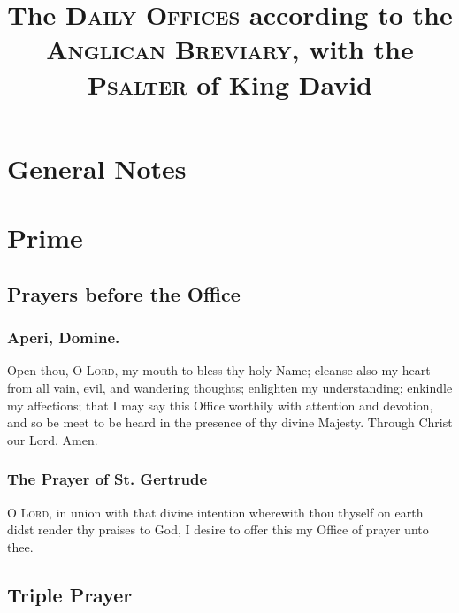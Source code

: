 \documentclass{article}
\title{The \textsc{Daily Offices} according to the \textsc{Anglican Breviary}, with the \textsc{Psalter} of King David}
\date{}
\author{}
\begin{document}
\maketitle
\newpage

\tableofcontents

\newpage

\section{General Notes}


\newpage

\section{Prime}

\subsection*{Prayers before the Office}


\subsubsection*{Aperi, Domine.}

Open thou, O \textsc{Lord}, my mouth to bless thy holy Name; cleanse also my heart from all vain, evil, and wandering thoughts; enlighten my understanding; enkindle my affections; that I may say this Office worthily with attention and devotion, and so be meet to be heard in the presence of thy divine Majesty. Through Christ our Lord. Amen.

\subsubsection*{The Prayer of St. Gertrude}

O \textsc{Lord}, in union with that divine intention wherewith thou thyself on earth didst render thy praises to God, I desire to offer this my Office of prayer unto thee.

\subsection*{Triple Prayer}
\end{document}
